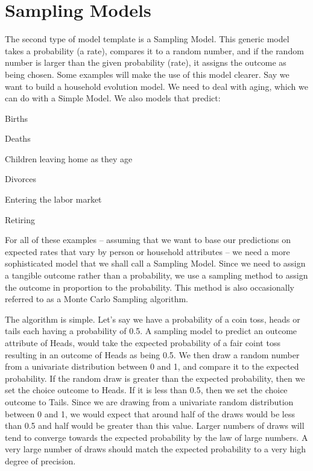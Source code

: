 \section{Sampling Models}
The second type of model template is a Sampling Model.  This
generic model takes a probability (a rate), compares it to a
random number, and if the random number is larger than the
given probability (rate), it assigns the outcome as being
chosen.  Some examples will make the use of this model
clearer. Say we want to build a household evolution model.
We need to deal with aging, which we can do with a Simple
Model.  We also models that predict:

\squishlist
\item Births
\item Deaths
\item Children leaving home as they age
\item Divorces
\item Entering the labor market
\item Retiring
\squishend

For all of these examples -- assuming that we want to base
our predictions on expected rates that vary by person or
household attributes -- we need a more sophisticated model
that we shall call a Sampling Model.  Since we need to
assign a tangible outcome rather than a probability, we use
a sampling method to assign the outcome in proportion to the
probability.  This method is also occasionally referred to
as a Monte Carlo Sampling algorithm.

The algorithm is simple.  Let's say we have a probability of
a coin toss, heads or tails each having a probability of
0.5.  A sampling model to predict an outcome attribute of
Heads, would take the expected probability of a fair coint
toss resulting in an outcome of Heads as being 0.5.  We then
draw a random number from a univariate distribution between
0 and 1, and compare it to the expected probability. If the
random draw is greater than the expected probability, then
we set the choice outcome to Heads.  If it is less than 0.5,
then we set the choice outcome to Tails.  Since we are
drawing from a univariate random distribution between 0 and
1, we would expect that around half of the draws would be
less than 0.5 and half would be greater than this value.
Larger numbers of draws will tend to converge towards the
expected probability by the law of large numbers.  A very
large number of draws should match the expected probability
to a very high degree of precision.

